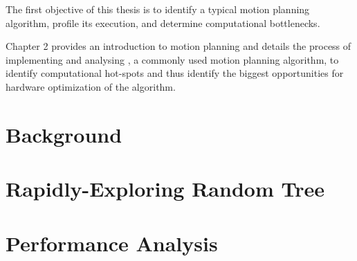 
The first objective of this thesis is to identify a typical motion planning algorithm, profile its execution, and determine computational bottlenecks.

Chapter 2 provides an introduction to motion planning and details the process of implementing and analysing , a commonly used motion planning algorithm, to identify computational hot-spots and thus identify the biggest opportunities for hardware optimization of the algorithm. \\

\section{Background} 
\label{section:motion_planning_background}
    

\newpage
\section{Rapidly-Exploring Random Tree}
\label{section:rrt}
    

\newpage
\section{Performance Analysis}
\label{section:rrt_analysis}
    